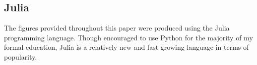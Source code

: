 \subsection{Julia}\label{Sect:julia}
The figures provided throughout this paper were produced using the Julia programming language. Though encouraged to use Python for the majority of my formal education, Julia is a relatively new and fast growing language in terms of popularity. 
